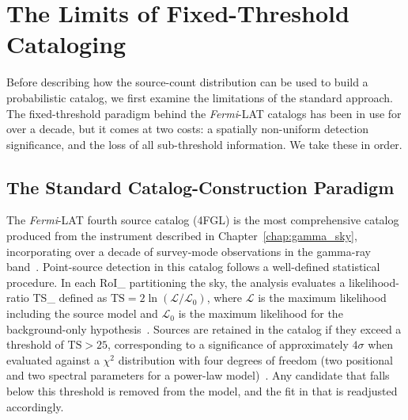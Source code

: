 
\section{The Limits of Fixed-Threshold Cataloging}
\label{sec:threshold_limits}

Before describing how the source-count distribution can be used to build a probabilistic catalog, we first examine the limitations of the standard approach.
The fixed-threshold paradigm behind the \textit{Fermi}-LAT catalogs has been in use for over a decade, but it comes at two costs: a spatially non-uniform detection significance, and the loss of all sub-threshold information.
We take these in order.

\subsection{The Standard Catalog-Construction Paradigm}
\label{sec:catalog_paradigm}

The \textit{Fermi}-LAT fourth source catalog (4FGL) is the most comprehensive catalog produced from the instrument described in Chapter~\ref{chap:gamma_sky}, incorporating over a decade of survey-mode observations in the gamma-ray band~\cite{Fermi-LAT:2019yla}.
Point-source detection in this catalog follows a well-defined statistical procedure.
In each \gls{RoI_} partitioning the sky, the analysis evaluates a likelihood-ratio \gls{TS_} defined as $\mathrm{TS} = 2\ln(\mathcal{L}/\mathcal{L}_0)$, where $\mathcal{L}$ is the maximum likelihood including the source model and $\mathcal{L}_0$ is the maximum likelihood for the background-only hypothesis~\cite{Fermi-LAT:2019yla}. Sources are retained in the catalog if they exceed a threshold of $\mathrm{TS} > 25$, corresponding to a significance of approximately $4\sigma$ when evaluated against a $\chi^2$ distribution with four degrees of freedom (two positional and two spectral parameters for a power-law model)~\cite{Fermi-LAT:2019yla}.
Any candidate that falls below this threshold is removed from the model, and the fit in that \RoI is readjusted accordingly.

